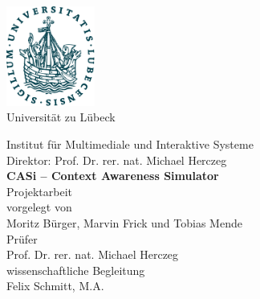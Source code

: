 \documentclass[11pt,    %
  english,ngerman,      %
  paper=a4,             %
  oneside,              %
  tablecaptionbelow,    %
  DIV=calc              %
  ]{scrbook}            %
\begin{document}
\lstset{language=Java}
\frontmatter


\thispagestyle{empty}
\vspace*{-2.2cm}
\begin{center}
  \includegraphics[width=2.9cm]{pics/uni-siegel.pdf}\\

  \vspace{.5cm}
  {
  \fontsize{16pt}{10pt}\selectfont
  Universität zu Lübeck\\
  }

  \vspace{.65cm}
  {
    \fontsize{14pt}{19pt}\selectfont
    Institut für Multimediale und Interaktive Systeme\\
    Direktor: Prof. Dr. rer. nat. Michael Herczeg\\
  }
  \vspace{2.5cm}
  {
    \fontsize{22pt}{22pt}\selectfont
    \bfseries
    CASi -- Context Awareness Simulator \\}
  \vspace{1.5cm}
  {
    \fontsize{16pt}{16pt}\selectfont
    Projektarbeit\\
  }
  \vspace{1.5cm}
  {
    \fontsize{13pt}{13pt}\selectfont
    vorgelegt von\\
    \vspace{10pt}
  Moritz Bürger, Marvin Frick und Tobias Mende\\
  }
  \vspace{2.5cm}
  {
    \fontsize{13pt}{13pt}\selectfont
    Prüfer\\
    \vspace{10pt}
    Prof. Dr. rer. nat. Michael Herczeg\\
  }
  \vspace{1.5cm}
  {
    \fontsize{13pt}{13pt}\selectfont
    wissenschaftliche Begleitung\\
    \vspace{10pt}
    Felix Schmitt, M.A.
  }
\end{center}
\end{document}
